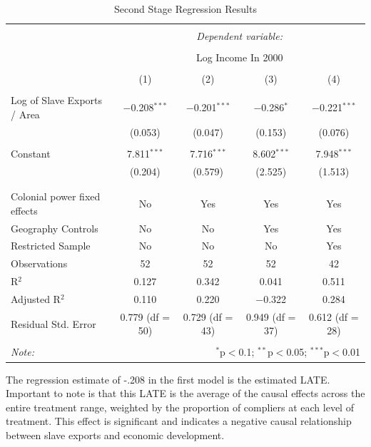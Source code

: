 \documentclass{article}\usepackage[]{graphicx}\usepackage[]{color}
\begin{document}
\begin{table}[H] \centering 
  \caption{Second Stage Regression Results} 
  \label{secondstage} 
\begin{tabular}{@{\extracolsep{5pt}}lcccc} 
\\[-1.8ex]\hline 
\hline \\[-1.8ex] 
 & \multicolumn{4}{c}{\textit{Dependent variable:}} \\ 
\cline{2-5} 
\\[-1.8ex] & \multicolumn{4}{c}{Log Income In 2000} \\ 
\\[-1.8ex] & (1) & (2) & (3) & (4)\\ 
\hline \\[-1.8ex] 
 Log of Slave Exports / Area & $-$0.208$^{***}$ & $-$0.201$^{***}$ & $-$0.286$^{*}$ & $-$0.221$^{***}$ \\ 
  & (0.053) & (0.047) & (0.153) & (0.076) \\ 
  & & & & \\ 
 Constant & 7.811$^{***}$ & 7.716$^{***}$ & 8.602$^{***}$ & 7.948$^{***}$ \\ 
  & (0.204) & (0.579) & (2.525) & (1.513) \\ 
  & & & & \\ 
\hline \\[-1.8ex] 
Colonial power fixed effects & No & Yes & Yes & Yes \\ 
Geography Controls & No & No & Yes & Yes \\ 
Restricted Sample & No & No & No & Yes \\ 
Observations & 52 & 52 & 52 & 42 \\ 
R$^{2}$ & 0.127 & 0.342 & 0.041 & 0.511 \\ 
Adjusted R$^{2}$ & 0.110 & 0.220 & $-$0.322 & 0.284 \\ 
Residual Std. Error & 0.779 (df = 50) & 0.729 (df = 43) & 0.949 (df = 37) & 0.612 (df = 28) \\ 
\hline 
\hline \\[-1.8ex] 
\textit{Note:}  & \multicolumn{4}{r}{$^{*}$p$<$0.1; $^{**}$p$<$0.05; $^{***}$p$<$0.01} \\ 
\end{tabular} 
\end{table} 


The regression estimate of -.208 in the first model is the estimated LATE. Important to note is that this LATE is the average of the causal effects across the entire treatment range, weighted by the proportion of compliers at each level of treatment.
This effect is significant and indicates a negative causal relationship between slave exports and economic development.
\end{document}
